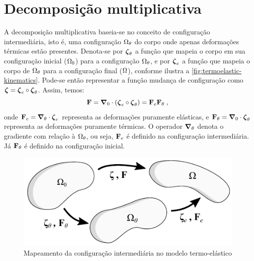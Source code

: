\documentclass[Tese.tex]{subfiles}
\begin{document}
\section{Decomposição multiplicativa}\label{subsec:dec-mult-termo-elastico}


A decomposição multiplicativa baseia-se no conceito de configuração intermediária, isto é, uma configuração $\Omega_{\theta}$ do corpo onde apenas deformações térmicas estão presentes. Denota-se por $\boldsymbol{\zeta}_{\theta}$ a função que mapeia o corpo em sua configuração inicial ($\Omega_0$) para a configuração $\Omega_{\theta}$, e por $\boldsymbol{\zeta}_e$ a função que mapeia o corpo de $\Omega_{\theta}$ para a configuração final ($\Omega$), conforme ilustra a \autoref{fig:termoelastic-kinematics}. Pode-se então representar a função mudança de configuração como $\boldsymbol{\zeta} = \boldsymbol{\zeta}_e\circ\boldsymbol{\zeta}_{\theta}$. Assim, temos:
\begin{equation}\label{eq:multiplicativa}
\mathbf{F} = \boldsymbol{\nabla}_0\cdot(\boldsymbol{\zeta}_e\circ\boldsymbol{\zeta}_{\theta}) = \mathbf{F}_e\mathbf{F}_{\theta}\;,
\end{equation}
onde $\mathbf{F}_e=\boldsymbol{\nabla}_{\theta}\cdot\boldsymbol{\zeta}_e$ representa as deformações puramente elásticas, e $\mathbf{F}_{\theta}=\boldsymbol{\nabla}_0\cdot\boldsymbol{\zeta}_{\theta}$ representa as deformações puramente térmicas. O operador $\boldsymbol{\nabla}_{\theta}$ denota o gradiente com relação à $\Omega_{\theta}$, ou seja, $\mathbf{F}_e$ é definido na configuração intermediária. Já $\mathbf{F}_{\theta}$ é definido na configuração inicial.

\begin{figure}[!htb]
	\centering
	\caption{Mapeamento da configuração intermediária no modelo termo-elástico}
	\label{fig:termoelastic-kinematics}
	\includegraphics[scale=1.0]{Figuras/termoelastic-kinematics.pdf}
\end{figure}
\end{document}
